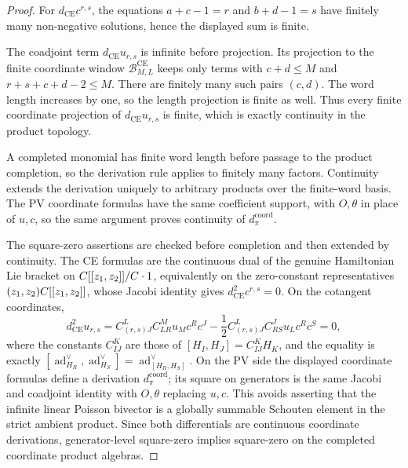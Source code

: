 \begin{proof}
  For \(d_{\mathrm{CE}}c^{r,s}\), the equations
  \(a+c-1=r\) and \(b+d-1=s\) have finitely many non-negative
  solutions, hence the displayed sum is finite.

  The coadjoint term \(d_{\mathrm{CE}}u_{r,s}\) is infinite before
  projection.  Its projection to the finite coordinate window
  \(\mathcal B_{M,L}^{\mathrm{CE}}\) keeps only terms with
  \(c+d\leq M\) and \(r+s+c+d-2\leq M\).  There are finitely many such
  pairs \((c,d)\).  The word length increases by one, so the length
  projection is finite as well.  Thus every finite coordinate
  projection of \(d_{\mathrm{CE}}u_{r,s}\) is finite, which is exactly
  continuity in the product topology.

  A completed monomial has finite word length before passage to the
  product completion, so the derivation rule applies to finitely many
  factors.  Continuity extends the derivation uniquely to arbitrary
  products over the finite-word basis.  The PV coordinate formulas have
  the same coefficient support, with \(O,\theta\) in place of \(u,c\), so
  the same argument proves continuity of \(d_\pi^{\mathrm{coord}}\).

  The square-zero assertions are checked before completion and then
  extended by continuity.  The CE formulas are the continuous dual of the
  genuine Hamiltonian Lie bracket on
  \(C[[z_1,z_2]]/C\cdot1\), equivalently on the zero-constant
  representatives \((z_1,z_2)C[[z_1,z_2]]\), whose Jacobi identity gives
  \(d_{\mathrm{CE}}^2c^{r,s}=0\).  On the cotangent coordinates,
  \[
    d_{\mathrm{CE}}^2u_{r,s}
    =
    C^L_{(r,s)J}C^M_{LR}u_Mc^Rc^J
    -\frac12 C^L_{(r,s)J}C^J_{RS}u_Lc^Rc^S
    =0,
  \]
  where the constants \(C^K_{IJ}\) are those of
  \([H_I,H_J]=C^K_{IJ}H_K\), and the equality is exactly
  \([\operatorname{ad}^{\vee}_{H_R},\operatorname{ad}^{\vee}_{H_S}]
    =\operatorname{ad}^{\vee}_{[H_R,H_S]}\).
  On the PV side the displayed coordinate formulas define a derivation
  \(d_\pi^{\mathrm{coord}}\); its square on generators is the same Jacobi
  and coadjoint identity with \(O,\theta\) replacing \(u,c\).  This avoids
  asserting that the infinite
  linear Poisson bivector is a globally summable Schouten element in the
  strict ambient product.  Since both differentials are continuous
  coordinate derivations, generator-level square-zero implies
  square-zero on the completed coordinate product algebras.
\end{proof}

